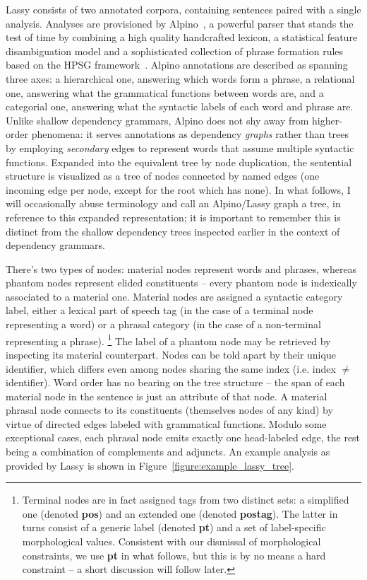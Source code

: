 Lassy consists of two annotated corpora, containing sentences paired with a single analysis.
Analyses are provisioned by Alpino~\cite{van2006last}, a powerful parser that stands the test of time by combining a high quality handcrafted lexicon, a statistical feature disambiguation model and a sophisticated collection of phrase formation rules based on the HPSG framework~\cite{pollard1994head}.
Alpino annotations are described as spanning three axes: a hierarchical one, answering which words form a phrase, a relational one, answering what the grammatical functions between words are, and a categorial one, answering what the syntactic labels of each word and phrase are.
Unlike shallow dependency grammars, Alpino does not shy away from higher-order phenomena: it serves annotations as dependency \textit{graphs} rather than trees by employing \textit{secondary} edges to represent words that assume multiple syntactic functions.
Expanded into the equivalent tree by node duplication, the sentential structure is visualized as a tree of nodes connected by named edges (one incoming edge per node, except for the root which has none).
In what follows, I will occasionally abuse terminology and call an Alpino/Lassy graph a tree, in reference to this expanded representation; it is important to remember this is distinct from the shallow dependency trees inspected earlier in the context of dependency grammars.

There's two types of nodes: material nodes represent words and phrases, whereas phantom nodes represent elided constituents -- every phantom node is indexically associated to a material one.
Material nodes are assigned a syntactic category label, either a lexical part of speech tag (in the case of a terminal node representing a word) or a phrasal category (in the case of a non-terminal representing a phrase).%
	\footnote{Terminal nodes are in fact assigned tags from two distinct sets: a simplified one (denoted \textbf{pos}) and an extended one (denoted \textbf{postag}). The latter in turns consist of a generic label (denoted \textbf{pt}) and a set of label-specific morphological values.
	Consistent with our dismissal of morphological constraints, we use \textbf{pt} in what follows, but this is by no means a hard constraint -- a short discussion will follow later.}
The label of a phantom node may be retrieved by inspecting its material counterpart.
Nodes can be told apart by their unique identifier, which differs even among nodes sharing the same index (i.e. index $\neq$ identifier).
Word order has no bearing on the tree structure -- the span of each material node in the sentence is just an attribute of that node.
A material phrasal node connects to its constituents (themselves nodes of any kind) by virtue of directed edges labeled with grammatical functions.
Modulo some exceptional cases, each phrasal node emits exactly one head-labeled edge, the rest being a combination of complements and adjuncts.
An example analysis as provided by Lassy is shown in Figure~\ref{figure:example_lassy_tree}.%

